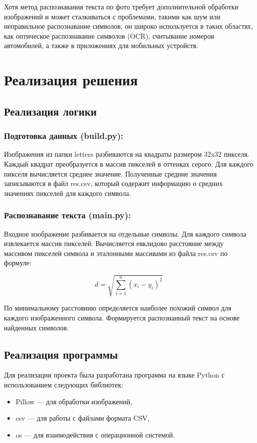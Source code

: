 \documentclass[14pt]{extreport}
\begin{document}
Хотя метод распознавания текста по фото требует дополнительной обработки изображений и может сталкиваться с проблемами, такими как шум или неправильное распознавание символов, он широко используется в таких областях, как оптическое распознавание символов (OCR), считывание номеров автомобилей, а также в приложениях для мобильных устройств.


\chapter{Реализация решения}

\section{Реализация логики}
\subsection{Подготовка данных (build.py):}
Изображения из папки letters разбиваются на квадраты размером 32x32 пикселя. Каждый квадрат преобразуется в массив пикселей в оттенках серого. Для каждого пикселя вычисляется среднее значение. Полученные средние значения записываются в файл res.csv, который содержит информацию о средних значениях пикселей для каждого символа.

\subsection{Распознавание текста (main.py):}
Входное изображение разбивается на отдельные символы. Для каждого символа извлекается массив пикселей. Вычисляется евклидово расстояние между массивом пикселей символа и эталонными массивами из файла res.csv по формуле:

\[
d = \sqrt{\sum_{i=1}^{n}(x_i - y_i)^2}
\]

По минимальному расстоянию определяется наиболее похожий символ для каждого изображенного символа. Формируется распознанный текст на основе найденных символов.

\section{Реализация программы}
Для реализации проекта была разработана программа на языке Python с использованием следующих библиотек:
\begin{itemize}
    \item Pillow — для обработки изображений,
    \item csv — для работы с файлами формата CSV,
    \item os — для взаимодействия с операционной системой.
\end{itemize}
\end{document}
